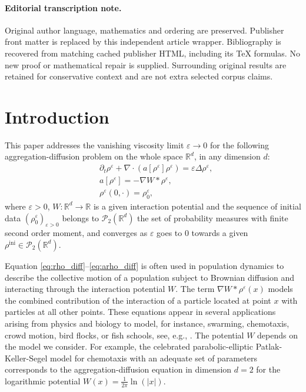 \documentclass[11pt]{article}
\numberwithin{equation}{section}
\newcommand{\ini}{\mathrm{ini}}
\def\RR{\mathbb{R}}
\def\eps{\varepsilon}
\def\pa{\partial}
\def\calP{{\mathcal P}}
\theoremstyle{plain}
\theoremstyle{definition}
\begin{document}
\paragraph{Editorial transcription note.}
Original author language, mathematics and ordering are preserved. Publisher front matter is replaced by this independent article wrapper. Bibliography is recovered from matching cached publisher HTML, including its TeX formulas. No new proof or mathematical repair is supplied. Surrounding original results are retained for conservative context and are not extra selected corpus claims.
\clearpage

\section{Introduction}

This paper addresses the vanishing viscosity limit $\varepsilon \to 0$ for the following aggregation-diffusion problem on the whole space $\RR^d$, in any dimension $d$:
\begin{subequations}\label{eq:agg_diff}
\begin{align}
& \pa_t \rho^\eps + \nabla \cdot (a[\rho^\eps] \rho^\eps) = \eps \Delta \rho^\eps, \label{eq:rho_diff} \\
& a[\rho^\eps] = - \nabla W * \rho^\eps, \label{eq:arho_diff} \\
& \rho^\eps(0, \cdot) = \rho_0^\eps, \label{eq:rho0_diff}
\end{align}
\end{subequations}
where $\eps > 0$, $W : \RR^d \to \RR$ is a given interaction potential and the sequence of initial data $(\rho_0^\eps)_{\eps>0}$ belongs to $\calP_2(\RR^d)$ the set of probability measures with finite second order moment, and converges as $\eps$ goes to 0 towards a given $\rho^{\ini} \in \calP_2(\RR^d)$.

Equation \eqref{eq:rho_diff}--\eqref{eq:arho_diff} is often used in population dynamics to describe the collective motion of a population subject to Brownian diffusion and interacting through the interaction potential $W$. The term $\nabla W * \rho^\eps(x)$ models the combined contribution of the interaction of a particle located at point $x$ with particles at all other points. These equations appear in several applications arising from physics and biology to model, for instance, swarming, chemotaxis, crowd motion, bird flocks, or fish schools, see, e.g., \cite{morale05, burger07,topaz06,topaz04,dolak05,JVChemotaxis}. The potential $W$ depends on the model we consider. For example, the celebrated parabolic-elliptic Patlak-Keller-Segel model \cite{keller71, keller71traveling} for chemotaxis with an adequate set of parameters corresponds to the aggregation-diffusion equation in dimension $d=2$ for the logarithmic potential $W(x) = \frac{1}{2\pi} \ln(|x|)$.
\end{document}
